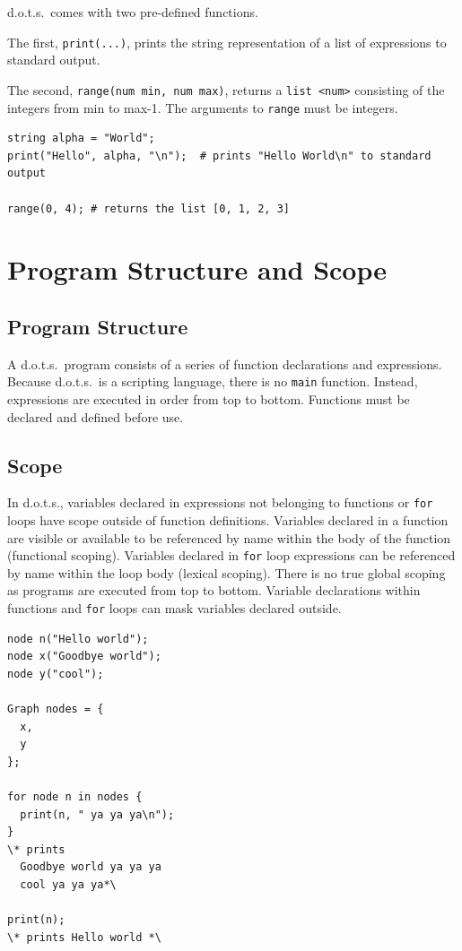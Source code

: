 \documentclass{article}
\newcommand{\pltlang}{d.o.t.s.} %
\newcommand{\code}[1]{\texttt{#1}} %
\begin{document}
\pltlang\ comes with two pre-defined functions. 

The first, \code{print(...)}, prints the string representation of a list of expressions to standard output.

The second, \code{range(num min, num max)}, returns a \code{list <num>} consisting of the integers from min to max-1. The arguments to \code{range} must be integers.

\begin{lstlisting}[language=pltLang, caption=The built-in ``print'' function., label=lst:builtin-functs]
string alpha = "World";
print("Hello", alpha, "\n");  # prints "Hello World\n" to standard output

range(0, 4); # returns the list [0, 1, 2, 3]
\end{lstlisting}

\section{Program Structure and Scope}

\subsection{Program Structure}

A \pltlang\ program consists of a series of function declarations and expressions. Because \pltlang\ is a scripting language, there is no \code{main} function. Instead, expressions are executed in order from top to bottom. Functions must be declared and defined before use. 

\subsection{Scope}

In \pltlang, variables declared in expressions not belonging to functions or \code{for} loops have scope outside of function definitions. Variables declared in a function are visible or available to be referenced by name within the body of the function (functional scoping). Variables declared in \code{for} loop expressions can be referenced by name within the loop body (lexical scoping). There is no true global scoping as programs are executed from top to bottom. Variable declarations within functions and \code{for} loops can mask variables declared outside.

\begin{lstlisting}[language=pltLang, caption=Example of masking, label=lst:scope-masking]
node n("Hello world");
node x("Goodbye world");
node y("cool");

Graph nodes = {
  x,
  y
};

for node n in nodes {
  print(n, " ya ya ya\n");
}
\* prints
  Goodbye world ya ya ya
  cool ya ya ya*\

print(n);
\* prints Hello world *\
\end{lstlisting}
\end{document}

